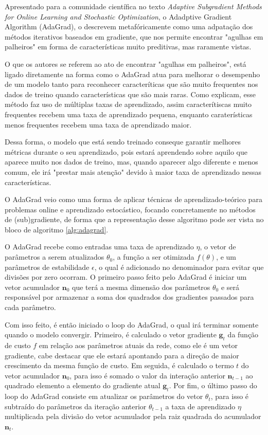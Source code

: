 Apresentado para a comunidade científica no texto \textit{Adaptive Subgradient Methods for Online Learning and Stochastic Optimization}, o Adadptive Gradient Algorithm (AdaGrad), \textcite{AdaGradMethod} o descrevem metafóricamente como uma adpatação dos métodos iterativos baseados em gradiente, que nos permite encontrar "agulhas em palheiros" em forma de características muito preditivas, mas raramente vistas.

O que os autores se referem ao ato de encontrar "agulhas em palheiros", está ligado diretamente na forma como o AdaGrad atua para melhorar o desempenho de um modelo tanto para reconhecer caracteríticas que são muito frequentes nos dados de treino quando características que são mais raras. Como \textcite{AdaGradMethod} explicam, esse método faz uso de múltiplas taxas de aprendizado, assim caracterítiscas muito frequentes recebem uma taxa de aprendizado pequena, enquanto caraterísticas menos frequentes recebem uma taxa de aprendizado maior.

Dessa forma, o modelo que está sendo treinado conseque garantir melhores métricas durante o seu aprendizado, pois estará aprendendo sobre aquilo que aparece muito nos dados de treino, mas, quando aparecer algo diferente e menos comum, ele irá "prestar mais atenção" devido à maior taxa de aprendizado nessas características.

O AdaGrad veio como uma forma de aplicar técnicas de aprendizado-teórico para problemas online e aprendizado estocástico, focando concretamente no métodos de (sub)gradiente, de forma que a representação desse algoritmo pode ser vista no bloco de algoritmo \ref{alg:adagrad}.

O AdaGrad recebe como entradas uma taxa de aprendizado $\eta$, o vetor de parâmetros a serem atualizados $\theta_0$, a função a ser otimizada $f(\theta)$, e um parâmetros de estabilidade $\epsilon$, o qual é adicionado no denominador para evitar que divisões por zero ocorram. O primeiro passo feito pelo AdaGrad é iniciar um vetor acumulador $\mathbf{n}_0$ que terá a mesma dimensão dos parâmetros $\theta_0$ e será responsável por armazenar a soma dos quadrados dos gradientes passados para cada parâmetro.

Com isso feito, é então iniciado o loop do AdaGrad, o qual irá terminar somente quando o modelo convergir. Primeiro, é calculado o vetor gradiente $\textbf{g}_t$ da função de custo $f$ em relação aos parâmetros atuais da rede, como ele é um vetor gradiente, cabe destacar que ele estará apontando para a direção de maior crescimento da mesma função de custo. Em seguida, é calculado o termo $t$ do vetor acumulador $\mathbf{n}_0$, para isso é somado o valor da interação anterior $\textbf{n}_{t-1}$ ao quadrado elemento a elemento do gradiente atual $\textbf{g}_t$. Por fim, o último passo do loop do AdaGrad consiste em atualizar os parâmetros do vetor $\theta_t$, para isso é subtraído do parâmetros da iteração anterior $\theta_{t-1}$ a taxa de aprendizado $\eta$ multiplicada pela divisão do vetor acumulador pela raiz quadrada do acumulador $\textbf{n}_t$.

